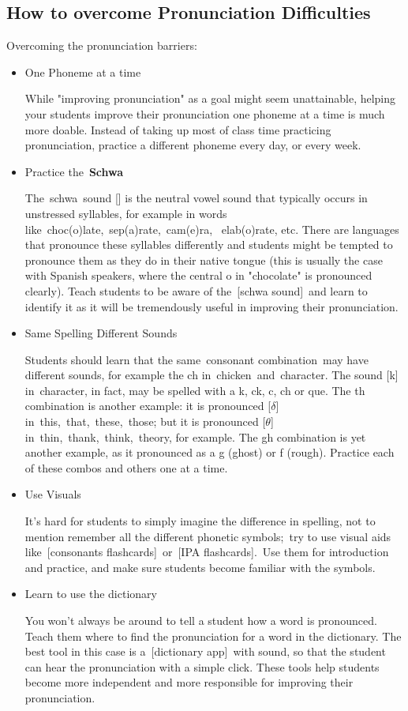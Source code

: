 \subsection{How to overcome Pronunciation Difficulties}

Overcoming the pronunciation barriers:

\begin{itemize}

\item One Phoneme at a time

While "improving pronunciation" as a goal might seem unattainable,
helping your students improve their pronunciation one phoneme at a time
is much more doable. Instead of taking up most of class time practicing
pronunciation, practice a different phoneme every day, or every week.

\item Practice the \textbf{Schwa}

The schwa sound [\textschwa] is the neutral vowel sound that typically occurs
in unstressed syllables, for example in words like choc(o)late, sep(a)rate, cam(e)ra, 
elab(o)rate, etc.  There are languages that pronounce these syllables differently
and students might be tempted to pronounce them as they do in their native tongue (this is
usually the case with Spanish speakers, where the central o in
"chocolate" is pronounced clearly). Teach students to be aware of
the [schwa sound] and learn to identify it as it will be tremendously useful in improving their
pronunciation.

\item Same Spelling Different Sounds

Students should learn that the same consonant combination may
have different sounds, for example the ch in chicken and character. The
sound [k] in character, in fact, may be spelled with a k, ck, c, ch or
que. The th combination is another example: it is pronounced [$\delta$]
in this, that, these, those; but it is pronounced [$\theta$]
in thin, thank, think, theory, for example. The gh combination is yet
another example, as it pronounced as a g (ghost) or f (rough). Practice
each of these combos and others one at a time.

\item Use Visuals

It's hard for students to simply imagine the difference in spelling, not
to mention remember all the different phonetic symbols; try to use
visual aids like [consonants flashcards] or [IPA
flashcards]. Use them for introduction and practice, and make sure students become familiar
with the symbols.

\item Learn to use the dictionary

You won't always be around to tell a student how a word is pronounced.
Teach them where to find the pronunciation for a word in the dictionary.
The best tool in this case is a [dictionary
app] with
sound, so that the student can hear the pronunciation with a simple
click. These tools help students become more independent and more
responsible for improving their pronunciation.

\end{itemize}





